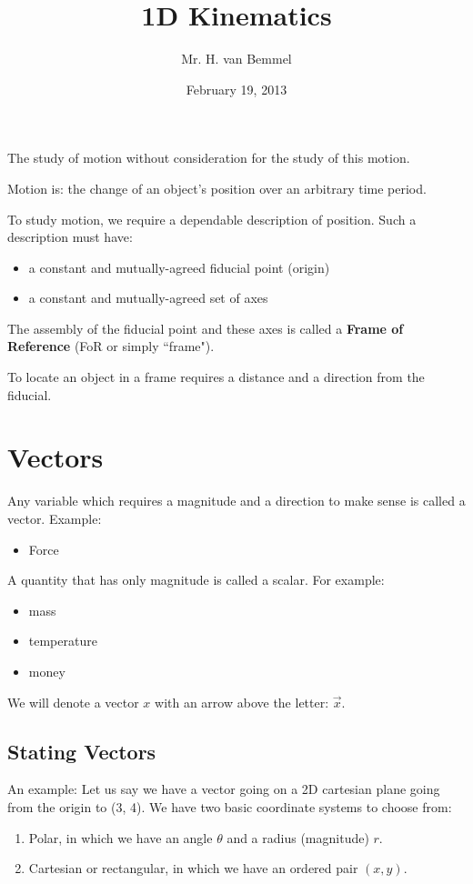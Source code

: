 \documentclass[letterpaper]{article}
\begin{document}
\title{1D Kinematics}
\author{Mr. H. van Bemmel}
\date{February 19, 2013}
\maketitle

The study of motion without consideration for the study of this motion.

Motion is: the change of an object's position over an arbitrary time period.

To study motion, we require a dependable description of position.
Such a description must have:
\begin{itemize}
    \item a constant and mutually-agreed fiducial point (origin)
    \item a constant and mutually-agreed set of axes
\end{itemize}
The assembly of the fiducial point and these axes is called a {\bf Frame of Reference} (FoR or simply ``frame").

To locate an object in a frame requires a distance and a direction from the fiducial.

\section{Vectors}
Any variable which requires a magnitude and a direction to make sense is called a vector.
Example:
\begin {itemize}
    \item Force
\end{itemize}

A quantity that has only magnitude is called a scalar. For example: 
\begin{itemize}
    \item mass
    \item temperature
    \item money
\end{itemize}

We will denote a vector $x$ with an arrow above the letter: $\vec{x}$.

\subsection{Stating Vectors}
An example:
    Let us say we have a vector going on a 2D cartesian plane going from the origin
    to (3, 4). We have two basic coordinate systems to choose from:
    \begin{enumerate}
        \item Polar, in which we have an angle $\theta$ and a radius (magnitude) $r$.
        \item Cartesian or rectangular, in which we have an ordered pair $(x, y)$.
    \end{enumerate}
\end{document}
